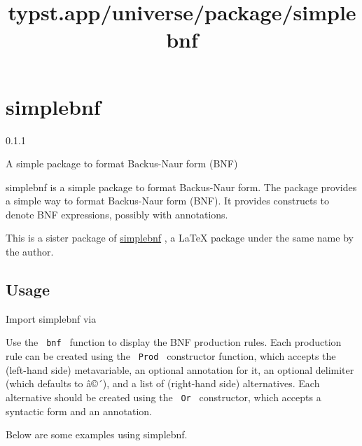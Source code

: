 \title{typst.app/universe/package/simplebnf}

\label{banner}
\section{simplebnf}\label{simplebnf}

{ 0.1.1 }

A simple package to format Backus-Naur form (BNF)

\label{readme}
simplebnf is a simple package to format Backus-Naur form. The package
provides a simple way to format Backus-Naur form (BNF). It provides
constructs to denote BNF expressions, possibly with annotations.

This is a sister package of
\href{https://github.com/Zeta611/simplebnf}{simplebnf} , a LaTeX package
under the same name by the author.

\subsection{Usage}\label{usage}

Import simplebnf via

\begin{Shaded}
\begin{Highlighting}[]
\end{Highlighting}
\end{Shaded}

Use the \texttt{\ bnf\ } function to display the BNF production rules.
Each production rule can be created using the \texttt{\ Prod\ }
constructor function, which accepts the (left-hand side) metavariable,
an optional annotation for it, an optional delimiter (which defaults to
â©´), and a list of (right-hand side) alternatives. Each alternative
should be created using the \texttt{\ Or\ } constructor, which accepts a
syntactic form and an annotation.

Below are some examples using simplebnf.

\begin{Shaded}
\begin{Highlighting}[]
\NormalTok{    \{}
\NormalTok{    \},}
\NormalTok{  ),}
\NormalTok{)}
\end{Highlighting}
\end{Shaded}

